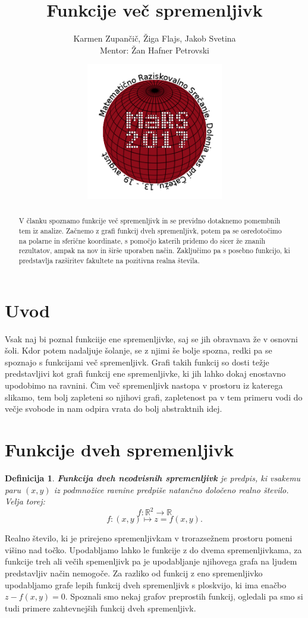\documentclass[12pt, a4paper]{article}
\title{Funkcije več spremenljivk}
\author{Karmen Zupančič, Žiga Flajs, Jakob Svetina \\ Mentor: Žan Hafner Petrovski}
\date{\includegraphics[width = 6cm]{logo_MaRS2017.png}}
\newtheorem{definicija}{Definicija}
\begin{document}
\maketitle

\begin{abstract}
V članku spoznamo funkcije več spremenljivk in se previdno dotaknemo pomembnih tem iz analize. Začnemo z grafi funkcij dveh spremenljivk, potem pa se osredotočimo na polarne in sferične koordinate, s pomočjo katerih pridemo do sicer že znanih rezultatov, ampak na nov in širše uporaben način. Zaključimo pa s posebno funkcijo, ki predstavlja razširitev fakultete na pozitivna realna števila.
\end{abstract}

\section{Uvod}
Vsak naj bi poznal funkciije ene spremenljivke, saj se jih obravnava že v osnovni šoli. Kdor potem nadaljuje šolanje, se z njimi še bolje spozna, redki pa se spoznajo s funkcijami več spremenljivk. Grafi takih funkcij so dosti težje predstavljivi kot grafi funkcij ene spremenljivke, ki jih lahko dokaj enostavno upodobimo na ravnini. Čim več spremenljivk nastopa v prostoru iz katerega slikamo, tem bolj zapleteni so njihovi grafi, zapletenost pa v tem primeru vodi do večje svobode in nam odpira vrata do bolj abstraktnih idej.

\section{Funkcije dveh spremenljivk}

\begin{definicija}
\textbf{Funkcija dveh neodvisnih spremenljivk} je predpis, ki vsakemu paru $(x,y)$ iz podmnožice ravnine predpiše natančno določeno realno število.
Velja torej: 
$$f : \mathbb{R}^2 \rightarrow \mathbb{R}$$
$$f:(x,y) \mapsto z=f(x,y).$$

\end{definicija}

Realno število, ki je prirejeno spremenljivkam v trorazsežnem prostoru pomeni višino nad točko. Upodabljamo lahko le funkcije z do dvema spremenljivkama, za funkcije treh ali večih spemenljivk pa je upodabljanje njihovega grafa na ljudem predstavljiv način nemogoče. Za razliko od funkcij z eno spremenljivko upodabljamo grafe lepih funkcij dveh spremenljivk s ploskvijo, ki ima enačbo $z-f(x,y)=0$. Spoznali smo nekaj grafov preprostih funkcij, ogledali pa smo si tudi primere zahtevnejših funkcij dveh spremenljivk.
\end{document}

